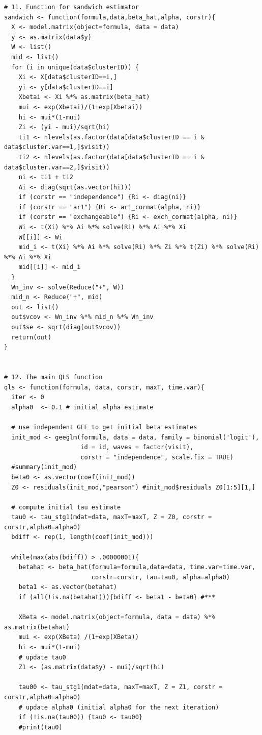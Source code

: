 \documentclass[
]{aft}
\begin{document}
\begin{verbatim}
# 11. Function for sandwich estimator 
sandwich <- function(formula,data,beta_hat,alpha, corstr){
  X <- model.matrix(object=formula, data = data)
  y <- as.matrix(data$y)
  W <- list()
  mid <- list()
  for (i in unique(data$clusterID)) {
    Xi <- X[data$clusterID==i,]
    yi <- y[data$clusterID==i]
    Xbetai <- Xi %*% as.matrix(beta_hat)
    mui <- exp(Xbetai)/(1+exp(Xbetai))
    hi <- mui*(1-mui)
    Zi <- (yi - mui)/sqrt(hi)
    ti1 <- nlevels(as.factor(data[data$clusterID == i & data$cluster.var==1,]$visit))
    ti2 <- nlevels(as.factor(data[data$clusterID == i & data$cluster.var==2,]$visit))
    ni <- ti1 + ti2
    Ai <- diag(sqrt(as.vector(hi)))
    if (corstr == "independence") {Ri <- diag(ni)}
    if (corstr == "ar1") {Ri <- ar1_cormat(alpha, ni)}
    if (corstr == "exchangeable") {Ri <- exch_cormat(alpha, ni)}
    Wi <- t(Xi) %*% Ai %*% solve(Ri) %*% Ai %*% Xi
    W[[i]] <- Wi
    mid_i <- t(Xi) %*% Ai %*% solve(Ri) %*% Zi %*% t(Zi) %*% solve(Ri) %*% Ai %*% Xi
    mid[[i]] <- mid_i
  }
  Wn_inv <- solve(Reduce("+", W))
  mid_n <- Reduce("+", mid)
  out <- list()
  out$vcov <- Wn_inv %*% mid_n %*% Wn_inv
  out$se <- sqrt(diag(out$vcov))
  return(out)
}


# 12. The main QLS function 
qls <- function(formula, data, corstr, maxT, time.var){
  iter <- 0
  alpha0  <- 0.1 # initial alpha estimate
  
  # use independent GEE to get initial beta estimates 
  init_mod <- geeglm(formula, data = data, family = binomial('logit'), 
                     id = id, waves = factor(visit), 
                     corstr = "independence", scale.fix = TRUE) 
  #summary(init_mod)
  beta0 <- as.vector(coef(init_mod))
  Z0 <- residuals(init_mod,"pearson") #init_mod$residuals Z0[1:5][1,]
  
  # compute initial tau estimate
  tau0 <- tau_stg1(mdat=data, maxT=maxT, Z = Z0, corstr = corstr,alpha0=alpha0) 
  bdiff <- rep(1, length(coef(init_mod)))
  
  while(max(abs(bdiff)) > .00000001){
    betahat <- beta_hat(formula=formula,data=data, time.var=time.var, 
                        corstr=corstr, tau=tau0, alpha=alpha0)
    beta1 <- as.vector(betahat)
    if (all(!is.na(betahat))){bdiff <- beta1 - beta0} #***
    
    XBeta <- model.matrix(object=formula, data = data) %*% as.matrix(betahat)
    mui <- exp(XBeta) /(1+exp(XBeta))
    hi <- mui*(1-mui)
    # update tau0
    Z1 <- (as.matrix(data$y) - mui)/sqrt(hi)

    tau00 <- tau_stg1(mdat=data, maxT=maxT, Z = Z1, corstr = corstr,alpha0=alpha0) 
    # update alpha0 (initial alpha0 for the next iteration)
    if (!is.na(tau00)) {tau0 <- tau00}
    #print(tau0)
    

\end{verbatim}
\end{document}
